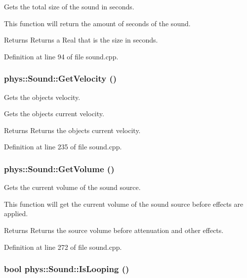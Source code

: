 Gets the total size of the sound in seconds. 

This function will return the amount of seconds of the sound. \begin{DoxyReturn}{Returns}
Returns a Real that is the size in seconds. 
\end{DoxyReturn}


Definition at line 94 of file sound.cpp.

\hypertarget{classphys_1_1Sound_a48e996b687ec11ff1d19400a010c4f07}{
\subsubsection[{GetVelocity}]{ phys::Sound::GetVelocity ()}}
\label{dc/d2f/classphys_1_1Sound_a48e996b687ec11ff1d19400a010c4f07}


Gets the objects velocity. 

Gets the objects current velocity. \begin{DoxyReturn}{Returns}
Returns the objects current velocity. 
\end{DoxyReturn}


Definition at line 235 of file sound.cpp.

\hypertarget{classphys_1_1Sound_ad386c2247f87d4b57bfae2c722282417}{
\subsubsection[{GetVolume}]{ phys::Sound::GetVolume ()}}
\label{dc/d2f/classphys_1_1Sound_ad386c2247f87d4b57bfae2c722282417}


Gets the current volume of the sound source. 

This function will get the current volume of the sound source before effects are applied. \begin{DoxyReturn}{Returns}
Returns the source volume before attenuation and other effects. 
\end{DoxyReturn}


Definition at line 272 of file sound.cpp.

\hypertarget{classphys_1_1Sound_a67f4a5475bc634c8ee894933cc09f933}{
\subsubsection[{IsLooping}]{\setlength{\rightskip}{0pt plus 5cm}bool phys::Sound::IsLooping ()}}
\label{dc/d2f/classphys_1_1Sound_a67f4a5475bc634c8ee894933cc09f933}


